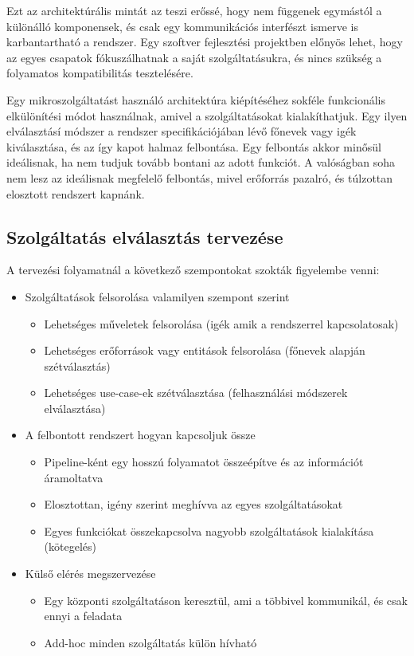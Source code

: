 \documentclass[11pt,magyar,a4paper,twoside,]{report}
\providecommand{\tightlist}{%
  \setlength{\itemsep}{0pt}\setlength{\parskip}{0pt}}
\begin{document}
Ezt az architektúrális mintát az teszi erőssé, hogy nem függenek
egymástól a különálló komponensek, és csak egy kommunikációs interfészt
ismerve is karbantartható a rendszer. Egy szoftver fejlesztési
projektben előnyös lehet, hogy az egyes csapatok fókuszálhatnak a saját
szolgáltatásukra, és nincs szükség a folyamatos kompatibilitás
tesztelésére.

Egy mikroszolgáltatást használó architektúra kiépítéséhez sokféle
funkcionális elkülönítési módot használnak, amivel a szolgáltatásokat
kialakíthatjuk. Egy ilyen elválasztásí módszer a rendszer
specifikációjában lévő főnevek vagy igék kiválasztása, és az így kapot
halmaz felbontása. Egy felbontás akkor minősül ideálisnak, ha nem tudjuk
tovább bontani az adott funkciót. A valóságban soha nem lesz az
ideálisnak megfelelő felbontás, mivel erőforrás pazalró, és túlzottan
elosztott rendszert kapnánk.

\subsection{Szolgáltatás elválasztás
tervezése}\label{szolguxe1ltatuxe1s-elvuxe1lasztuxe1s-tervezuxe9se}

A tervezési folyamatnál a következő szempontokat szokták figyelembe
venni:

\begin{itemize}
\tightlist
\item
  Szolgáltatások felsorolása valamilyen szempont szerint

  \begin{itemize}
  \tightlist
  \item
    Lehetséges műveletek felsorolása (igék amik a rendszerrel
    kapcsolatosak)
  \item
    Lehetséges erőforrások vagy entitások felsorolása (főnevek alapján
    szétválasztás)
  \item
    Lehetséges use-case-ek szétválasztása (felhasználási módszerek
    elválasztása)
  \end{itemize}
\item
  A felbontott rendszert hogyan kapcsoljuk össze

  \begin{itemize}
  \tightlist
  \item
    Pipeline-ként egy hosszú folyamatot összeépítve és az információt
    áramoltatva
  \item
    Elosztottan, igény szerint meghívva az egyes szolgáltatásokat
  \item
    Egyes funkciókat összekapcsolva nagyobb szolgáltatások kialakítása
    (kötegelés)
  \end{itemize}
\item
  Külső elérés megszervezése

  \begin{itemize}
  \tightlist
  \item
    Egy központi szolgáltatáson keresztül, ami a többivel kommunikál, és
    csak ennyi a feladata
  \item
    Add-hoc minden szolgáltatás külön hívható
  \end{itemize}
\end{itemize}
\end{document}
